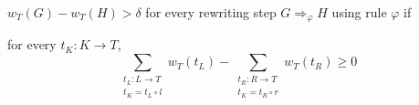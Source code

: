 \documentclass{beamer}
\begin{document}
\begin{frame}{ $w_T(G) - w_T(H) > \delta$ for every rewriting step $G \Rightarrow_\varphi H$ using rule $\varphi$ if}

  for every $t_K: K \rightarrow T$, 
    $$ \sum_{\substack{t_L: L \rightarrow T\\ t_K =  t_L \circ l }}
        w_T(t_L) -  \sum_{\substack{t_R: R \rightarrow T\\ t_K = t_R \circ r}}
            w_T(t_R) \geq 0 $$ 


\end{frame}
\end{document}
